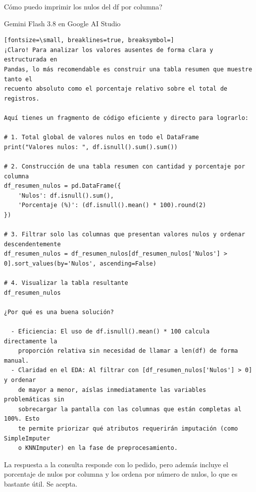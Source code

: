 \documentclass[12pt,a4paper,oneside]{book}
\begin{document}
\begin{iaprompt}
Cómo puedo imprimir los nulos del df por columna?
\end{iaprompt}
\begin{iaresp}{Gemini Flash 3.8 en Google AI Studio}
\begin{Verbatim}[fontsize=\small, breaklines=true, breaksymbol=]
¡Claro! Para analizar los valores ausentes de forma clara y estructurada en
Pandas, lo más recomendable es construir una tabla resumen que muestre tanto el
recuento absoluto como el porcentaje relativo sobre el total de registros.

Aquí tienes un fragmento de código eficiente y directo para lograrlo:

# 1. Total global de valores nulos en todo el DataFrame
print("Valores nulos: ", df.isnull().sum().sum())

# 2. Construcción de una tabla resumen con cantidad y porcentaje por columna
df_resumen_nulos = pd.DataFrame({
    'Nulos': df.isnull().sum(),
    'Porcentaje (%)': (df.isnull().mean() * 100).round(2)
})

# 3. Filtrar solo las columnas que presentan valores nulos y ordenar descendentemente
df_resumen_nulos = df_resumen_nulos[df_resumen_nulos['Nulos'] > 0].sort_values(by='Nulos', ascending=False)

# 4. Visualizar la tabla resultante
df_resumen_nulos

¿Por qué es una buena solución?

  - Eficiencia: El uso de df.isnull().mean() * 100 calcula directamente la
    proporción relativa sin necesidad de llamar a len(df) de forma manual.
  - Claridad en el EDA: Al filtrar con [df_resumen_nulos['Nulos'] > 0] y ordenar
    de mayor a menor, aíslas inmediatamente las variables problemáticas sin
    sobrecargar la pantalla con las columnas que están completas al 100%. Esto
    te permite priorizar qué atributos requerirán imputación (como SimpleImputer
    o KNNImputer) en la fase de preprocesamiento.
\end{Verbatim}
\end{iaresp}
\begin{iaanalisis}
La respuesta a la consulta responde con lo pedido, pero además incluye el porcentaje de nulos por columna y los ordena por número de nulos, lo que es bastante útil. Se acepta.
\end{iaanalisis}
\end{document}
